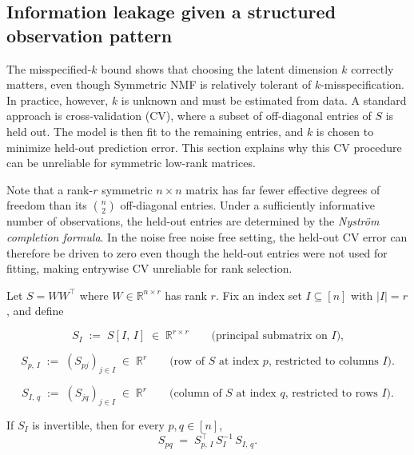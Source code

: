 \documentclass{article}
\begin{document}
\subsection{Information leakage given a structured observation pattern}
\label{subsec:info_leakage}
The misspecified-$k$ bound shows that choosing the latent dimension $k$ correctly matters, even though Symmetric NMF is relatively tolerant of $k$-misspecification. In practice, however, $k$ is unknown and must be estimated from data. A standard approach is cross-validation (CV), where a subset of off-diagonal entries of $S$ is held out. The model is then fit to the remaining entries, and $k$ is chosen to minimize held-out prediction error. This section explains why this CV procedure can be unreliable for symmetric low-rank matrices.

Note that a rank-$r$ symmetric $n \times n$ matrix has far fewer effective degrees of freedom than its $\binom{n}{2}$ off-diagonal entries. Under a sufficiently informative number of observations, the held-out entries are determined by the \emph{Nystr\"om completion formula}. In the noise free noise free setting, the held-out CV error can therefore be driven to zero even though the held-out entries were not used for fitting, making entrywise CV unreliable for rank selection.

\begin{theorem}
\label{thm:sym_nystrom}
Let $S = W W^\top$ where $W \in \mathbb{R}^{n \times r}$ has rank $r$.
Fix an index set $I \subseteq [n]$ with $|I| = r$, and define

\begin{equation}
S_I \;:=\; S[I,\,I] \;\in\; \mathbb{R}^{r \times r}
\qquad\text{(principal submatrix on }I\text{),}
\end{equation}

\begin{equation}
S_{p,\,I} \;:=\; (S_{pj})_{j \in I} \;\in\; \mathbb{R}^{r}
\qquad\text{(row of $S$ at index $p$, restricted to columns $I$).}
\end{equation}

\begin{equation}
S_{I,\,q} \;:=\; (S_{jq})_{j \in I} \;\in\; \mathbb{R}^{r}
\qquad\text{(column of $S$ at index $q$, restricted to rows $I$).}
\end{equation}

If $S_I$ is invertible, then for every $p, q \in [n]$,
\begin{equation}
S_{pq} \;=\; S_{p,\,I}^\top \, S_I^{-1} \, S_{I,\,q}.
\label{eqt:sym_nystrom}
\end{equation}
\end{theorem}
\end{document}
